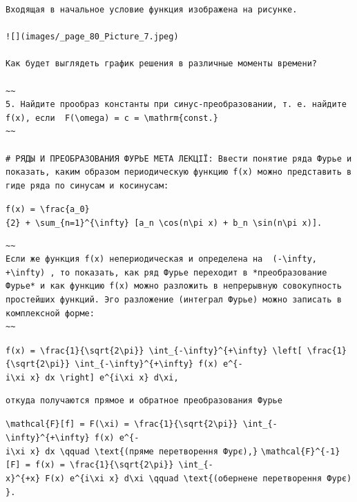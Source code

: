 \documentclass[
  ukrainian,
]{article}
\begin{document}
\begin{verbatim}
Входящая в начальное условие функция изображена на рисунке.

![](images/_page_80_Picture_7.jpeg)

Как будет выглядеть график решения в различные моменты времени?

~~
5. Найдите прообраз константы при синус-преобразовании, т. е. найдите f(x), если  F(\omega) = c = \mathrm{const.}
~~

# РЯДЫ И ПРЕОБРАЗОВАНИЯ ФУРЬЕ МЕТА ЛЕКЦІЇ: Ввести понятие ряда Фурье и показать, каким образом периодическую функцию f(x) можно представить в гиде ряда по синусам и косинусам:
\end{verbatim}

\texttt{f(x)\ =\ \textbackslash{}frac\{a\_0\}\{2\}\ +\ \textbackslash{}sum\_\{n=1\}\^{}\{\textbackslash{}infty\}\ {[}a\_n\ \textbackslash{}cos(n\textbackslash{}pi\ x)\ +\ b\_n\ \textbackslash{}sin(n\textbackslash{}pi\ x){]}.}

\begin{verbatim}
~~
Если же функция f(x) непериодическая и определена на  (-\infty, +\infty) , то показать, как ряд Фурье переходит в *преобразование Фурье* и как функцию f(x) можно разложить в непрерывную совокупность простейших функций. Эго разложение (интеграл Фурье) можно записать в комплексной форме:
~~
\end{verbatim}

\texttt{f(x)\ =\ \textbackslash{}frac\{1\}\{\textbackslash{}sqrt\{2\textbackslash{}pi\}\}\ \textbackslash{}int\_\{-\textbackslash{}infty\}\^{}\{+\textbackslash{}infty\}\ \textbackslash{}left{[}\ \textbackslash{}frac\{1\}\{\textbackslash{}sqrt\{2\textbackslash{}pi\}\}\ \textbackslash{}int\_\{-\textbackslash{}infty\}\^{}\{+\textbackslash{}infty\}\ f(x)\ e\^{}\{-i\textbackslash{}xi\ x\}\ dx\ \textbackslash{}right{]}\ e\^{}\{i\textbackslash{}xi\ x\}\ d\textbackslash{}xi,}

\begin{verbatim}
откуда получаются прямое и обратное преобразования Фурье
\end{verbatim}

\texttt{\textbackslash{}mathcal\{F\}{[}f{]}\ =\ F(\textbackslash{}xi)\ =\ \textbackslash{}frac\{1\}\{\textbackslash{}sqrt\{2\textbackslash{}pi\}\}\ \textbackslash{}int\_\{-\textbackslash{}infty\}\^{}\{+\textbackslash{}infty\}\ f(x)\ e\^{}\{-i\textbackslash{}xi\ x\}\ dx\ \textbackslash{}qquad\ \textbackslash{}text\{(пряме\ перетворення\ Фур\textquotesingle{}є),\}}
\texttt{\textbackslash{}mathcal\{F\}\^{}\{-1\}{[}F{]}\ =\ f(x)\ =\ \textbackslash{}frac\{1\}\{\textbackslash{}sqrt\{2\textbackslash{}pi\}\}\ \textbackslash{}int\_\{-x\}\^{}\{+x\}\ F(x)\ e\^{}\{i\textbackslash{}xi\ x\}\ d\textbackslash{}xi\ \textbackslash{}qquad\ \textbackslash{}text\{(обернене\ перетворення\ Фур\textquotesingle{}є)\}.}
\end{document}
